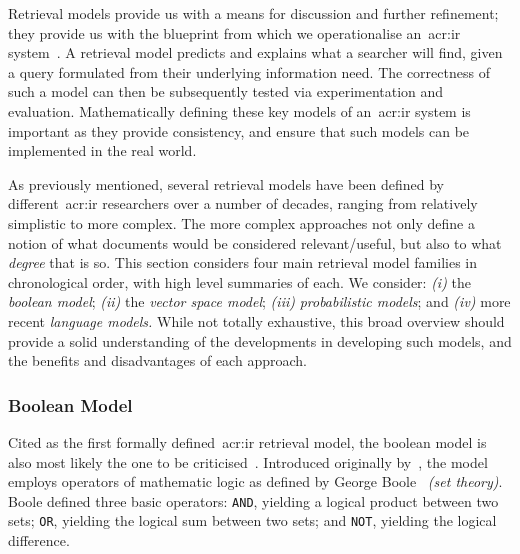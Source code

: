 Retrieval models provide us with a means for discussion and further refinement; they provide us with the blueprint from which we operationalise an~\gls{acr:ir} system~\citep{hiemstra2009ir_models}. A retrieval model predicts and explains what a searcher will find, given a query formulated from their underlying information need. The correctness of such a model can then be subsequently tested via experimentation and evaluation. Mathematically defining these key models of an~\gls{acr:ir} system is important as they provide consistency, and ensure that such models can be implemented in the real world.

As previously mentioned, several retrieval models have been defined by different~\gls{acr:ir} researchers over a number of decades, ranging from relatively simplistic to more complex. The more complex approaches not only define a notion of what documents would be considered relevant/useful, but also to what \emph{degree} that is so. This section considers four main retrieval model families in chronological order, with high level summaries of each. We consider: \emph{(i)} the \emph{boolean model}; \emph{(ii)} the \emph{vector space model}; \emph{(iii)} \emph{probabilistic models}; and \emph{(iv)} more recent \emph{language models.} While not totally exhaustive, this broad overview should provide a solid understanding of the developments in developing such models, and the benefits and disadvantages of each approach.


\subsubsection{Boolean Model}\label{sec:ir_background:basics:models:boolean}
Cited as the first formally defined~\gls{acr:ir} retrieval model, the boolean model is also most likely the one to be criticised~\citep{hiemstra2009ir_models}. Introduced originally by~\cite{rijsbergen1979ir}, the model employs operators of mathematic logic as defined by George Boole~\citep{boole1847mathematical} \emph{(set theory)}. Boole defined three basic operators: \texttt{AND}, yielding a logical product between two sets; \texttt{OR}, yielding the logical sum between two sets; and \texttt{NOT}, yielding the logical difference.

